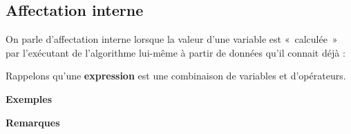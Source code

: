 		\subsection{Affectation interne }

			On parle d’affectation interne lorsque la valeur d’une variable est
			«~calculée~» par l’exécutant de l’algorithme lui-même à partir de
			données qu’il connait déjà :

			
			Rappelons qu’une \textbf{expression} 
			est une combinaison de variables et
			d’opérateurs.
			
			{\bfseries
			Exemples}
			

			{\bfseries
			Remarques}


